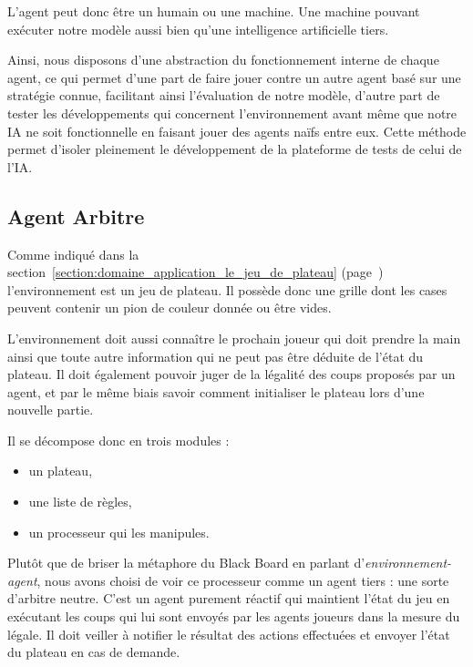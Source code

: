 L'agent peut donc être un humain ou une machine. Une machine pouvant exécuter notre modèle aussi bien qu'une intelligence artificielle tiers. 

Ainsi, nous disposons d'une abstraction du fonctionnement interne de chaque agent, ce qui permet d'une part de faire jouer \cogito{} contre un autre agent basé sur une stratégie connue, facilitant ainsi l'évaluation de notre modèle, d'autre part de tester les développements qui concernent l'environnement avant même que notre IA ne soit fonctionnelle en faisant jouer des agents naïfs entre eux. Cette méthode permet d'isoler pleinement le développement de la plateforme de tests de celui de l'IA.

\subsection{ Agent \og Arbitre \fg{} }

Comme indiqué dans la section~\ref{section:domaine_application_le_jeu_de_plateau} (page~\pageref{section:domaine_application_le_jeu_de_plateau}) l'environnement est un jeu de plateau. Il possède donc une grille dont les cases peuvent contenir un pion de couleur donnée ou être vides.

L'environnement doit aussi connaître le prochain joueur qui doit prendre la main ainsi que toute autre information qui ne peut pas être déduite de l'état du plateau. Il doit également pouvoir juger de la légalité des coups proposés par un agent, et par le même biais savoir comment initialiser le plateau lors d'une nouvelle partie.

Il se décompose donc en trois modules :
\begin{itemize}
\item un plateau,
\item une liste de règles,
\item un processeur qui les manipules.
\end{itemize}

Plutôt que de briser la métaphore du \og Black Board \fg{} en parlant d'\emph{environnement-agent}, nous avons choisi de voir ce processeur comme un agent tiers : une sorte d'arbitre neutre. C'est un agent purement réactif qui maintient l'état du jeu en exécutant les coups qui lui sont envoyés par les agents joueurs dans la mesure du légale. Il doit veiller à notifier le résultat des actions effectuées et envoyer l'état du plateau en cas de demande.

